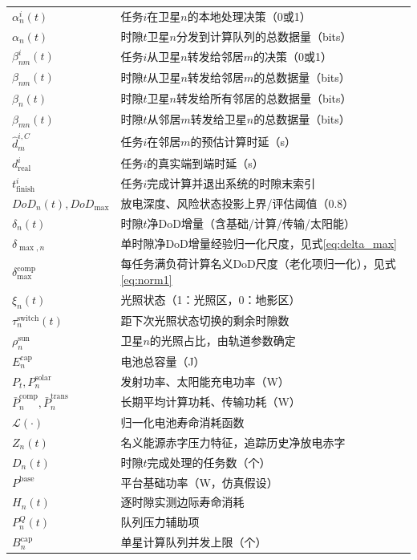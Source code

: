 \documentclass[a4paper,11pt]{article}
\begin{document}
\begin{table}[t]
\begin{tabular}{ll}
$\alpha^i_n(t)$ & 任务$i$在卫星$n$的本地处理决策（0或1） \\
$\alpha_n(t)$ & 时隙$t$卫星$n$分发到计算队列的总数据量（bits） \\
$\beta^i_{nm}(t)$ & 任务$i$从卫星$n$转发给邻居$m$的决策（0或1） \\
$\beta_{nm}(t)$ & 时隙$t$从卫星$n$转发给邻居$m$的总数据量（bits） \\
$\beta_n(t)$ & 时隙$t$卫星$n$转发给所有邻居的总数据量（bits） \\
$\beta_{mn}(t)$ & 时隙$t$从邻居$m$转发给卫星$n$的总数据量（bits） \\
$\hat{d}^{i,C}_m$ & 任务$i$在邻居$m$的预估计算时延（s） \\
$d^i_{\mathrm{real}}$ & 任务$i$的真实端到端时延（s） \\
$t^i_{\mathrm{finish}}$ & 任务$i$完成计算并退出系统的时隙末索引 \\
$DoD_n(t), DoD_{\max}$ & 放电深度、风险状态投影上界/评估阈值（0.8） \\
$\delta_n(t)$ & 时隙$t$净DoD增量（含基础/计算/传输/太阳能） \\
$\delta_{\max,n}$ & 单时隙净DoD增量经验归一化尺度，见式\eqref{eq:delta_max} \\
$\delta^{\mathrm{comp}}_{\max}$ & 每任务满负荷计算名义DoD尺度（老化项归一化），见式\eqref{eq:norm1} \\
$\xi_n(t)$ & 光照状态（1：光照区，0：地影区） \\
$\tau^{\mathrm{switch}}_n(t)$ & 距下次光照状态切换的剩余时隙数 \\
$\rho^{\mathrm{sun}}_n$ & 卫星$n$的光照占比，由轨道参数确定 \\
$E^{\mathrm{cap}}_n$ & 电池总容量（J） \\
$P_t, P^{\mathrm{solar}}_n$ & 发射功率、太阳能充电功率（W） \\
$\bar{P}^{\mathrm{comp}}_n, \bar{P}^{\mathrm{trans}}_n$ & 长期平均计算功耗、传输功耗（W） \\
$\mathcal{L}(\cdot)$ & 归一化电池寿命消耗函数 \\
$Z_n(t)$ & 名义能源赤字压力特征，追踪历史净放电赤字 \\
$D_n(t)$ & 时隙$t$完成处理的任务数（个） \\
$P^{\mathrm{base}}$ & 平台基础功率（W，仿真假设） \\
$H_n(t)$ & 逐时隙实测边际寿命消耗 \\
$P^Q_n(t)$ & 队列压力辅助项 \\
$B^{\mathrm{cap}}_n$ & 单星计算队列并发上限（个） \\

\end{tabular}
\end{table}
\end{document}
